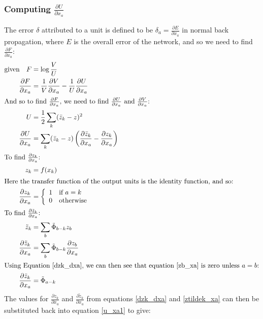 \documentclass[a4paper]{article}
\newcommand{\zbar}{\bar{z}}
\newcommand{\ztilde}{\tilde{z}}
\newcommand{\skernel}{\tilde{\Phi}}
\newcommand{\pdiff}[2]{ \frac{\partial #1}{\partial #2}}
\begin{document}
\subsubsection{Computing $\pdiff{U}{x_a}$}
The error $\delta$ attributed to a unit is defined to be $\delta_a =
\pdiff{E}{x_a}$ in normal back propagation, where $E$ is the overall
error of the network, and so we need to find $\pdiff{F}{x_a}$:
\begin{align}
  \text{given}\quad F &= \log \frac{V}{U} \\
  \pdiff{F}{x_a} &= \frac{1}{V} \pdiff{V}{x_a} - 
  \frac{1}{U}
  \pdiff{U}{x_a}\\
  \intertext{And so to find $\pdiff{F}{x_a}$, we need to find
    $\pdiff{U}{x_a}$ and $\pdiff{V}{x_a}$:}
  U &= \frac{1}{2} \sum_k (\zbar_k - z)^2 \\
  \pdiff{U}{x_a} &= \sum_k (\zbar_k - z) \left( \pdiff{\zbar_k}{x_a} - 
    \pdiff{z_k}{x_a} \right) \label{u_xa1}\\
  \intertext{To find   $\pdiff{z_k}{x_a}$:}
  z_k &= f(x_k)\\
  \intertext{Here the transfer function of the output units is the
    identity function, and so:}
  \pdiff{z_k}{x_a} & = \left\{
    \begin{array}{ll}
      1 & \text{if $a=k$} \\
      0 & \text{otherwise} \\
    \end{array}
  \right. %
  \label{dzk_dxa}\\
  \intertext{To find $\pdiff{\ztilde_k}{x_a}$:}
  \ztilde_k  &= \sum_b \skernel_{b-k} z_b \\
  \pdiff{\ztilde_k}{x_a} &= \sum_b \skernel_{b-k} \pdiff{z_b}{x_a} 
  \label{zb_xa}\\
  \intertext{Using Equation \ref{dzk_dxa}, we can then see that equation
    \ref{zb_xa} is zero unless $a=b$:}
  \pdiff{\ztilde_k}{x_a} &= \skernel_{a-k} \label{ztildek_xa}
\end{align}
The values for $\pdiff{z_k}{x_a}$ and $\pdiff{\ztilde_k}{x_a}$ from
equations \ref{dzk_dxa} and \ref{ztildek_xa} can then be substituted
back into equation \ref{u_xa1} to give:
\end{document}
